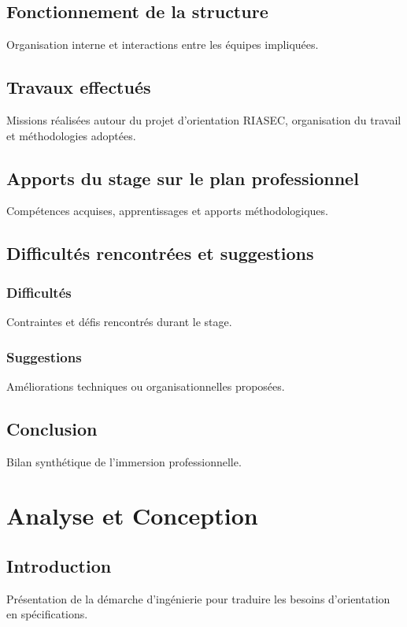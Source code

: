 \documentclass[12pt,a4paper]{report}
\begin{document}
\section{Fonctionnement de la structure}
Organisation interne et interactions entre les équipes impliquées.

\section{Travaux effectués}
Missions réalisées autour du projet d’orientation RIASEC, organisation du travail et méthodologies adoptées.

\section{Apports du stage sur le plan professionnel}
Compétences acquises, apprentissages et apports méthodologiques.

\section{Difficultés rencontrées et suggestions}
\subsection*{Difficultés}
Contraintes et défis rencontrés durant le stage.
\subsection*{Suggestions}
Améliorations techniques ou organisationnelles proposées.

\section{Conclusion}
Bilan synthétique de l’immersion professionnelle.

\chapter{Analyse et Conception}

\section{Introduction}
Présentation de la démarche d’ingénierie pour traduire les besoins d’orientation en spécifications.
\end{document}
